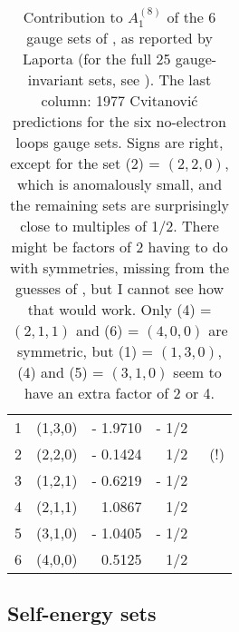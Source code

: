 \begin{table}
\small
\begin{center}
\begin{tabular}{rrrrr}
\hline
   1  & (1,3,0) & - 1.9710    & - 1/2  \\%
   2  & (2,2,0) &  - 0.1424   & \phantom{+} 1/2 &~(!)\\%
   3  & (1,2,1) &  - 0.6219   & - 1/2  \\%
   4  & (2,1,1) &  \phantom{+} 1.0867  & \phantom{+} 1/2  \\%
   5  & (3,1,0) &  - 1.0405   & - 1/2  \\%
   6  & (4,0,0) &  \phantom{+} 0.5125  & \phantom{+} 1/2  \\%
\hline
\end{tabular}
\end{center}
\caption{
Contribution to $A^{(8)}_1$ of the 6 gauge sets of
, as reported by Laporta
(for the full 25 gauge-invariant sets, see ).
The last column: 1977 Cvitanovi\'c predictions
for the six no-electron loops gauge sets.
Signs are right, except for the set (2) = $(2,2,0)$, which is anomalously small,
and the remaining sets are surprisingly close to multiples of 1/2.
There might be factors of 2 having to do with symmetries, missing from the
guesses of , but I cannot see how that would work.
Only (4) = $(2,1,1)$ and  (6) = $(4,0,0)$ are symmetric,
but (1) = $(1,3,0)$, (4) and (5) = $(3,1,0)$ seem to
have an extra factor of 2 or 4.
}
\label{Laporta17:tablesetShort}
\end{table}

\subsection{Self-energy sets}
\label{sect:selfEnergy}

